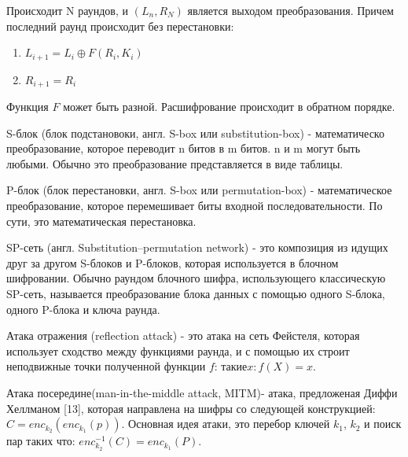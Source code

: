 \documentclass[colorthm]{./civarticle}
\begin{document}
\begin{definition}
    Происходит N раундов, и $(L_n, R_N)$ является выходом преобразования. Причем последний раунд происходит без перестановки:

    \begin{enumerate}
        \item $L_{i+1} = L_i \oplus F(R_i, K_i)$
        \item $R_{i+1} = R_i$
    \end{enumerate}
    
    Функция $F$ может быть разной. Расшифрование происходит в обратном порядке.
  
\end{definition}

\begin{definition}
    S-блок (блок подстановоки, англ. S-box или substitution-box) - математическо преобразование, которое переводит n битов в m битов. n и m могут быть любыми. Обычно это преобразование представляется в виде таблицы.
\end{definition}

\begin{definition}
    P-блок (блок перестановки, англ. S-box или permutation-box) - математическое преобразование, которое перемешивает биты входной последовательности. По сути, это математическая перестановка.
\end{definition}

\begin{definition}
    SP-сеть (англ. Substitution–permutation network) - это композиция из идущих друг за другом S-блоков и P-блоков, которая используется в блочном шифровании. Обычно раундом блочного шифра, использующего классическую SP-сеть, называется преобразование блока данных с помощью одного S-блока, одного P-блока и ключа раунда.
\end{definition}

\begin{definition}
    Атака отражения (reflection attack) - это атака на сеть Фейстеля, которая использует сходство между функциями раунда, и с помощью их строит неподвижные точки полученной функции $f$: ${такие x: f(X) = x}$.
\end{definition}

\begin{definition}
    Атака  посередине\textquotedbl (man-in-the-middle attack, MITM)- атака, предложеная Диффи Хеллманом [13], которая направлена на шифры со следующей конструкцией: $C = enc_{k_2}(enc_{k_1}(p))$. Основная идея атаки, это перебор ключей $k_1$, $k_2$ и поиск пар таких что: $enc^{-1}_{k_2}(C) = enc_{k_1}(P)$.
\end{definition}
\end{document}
